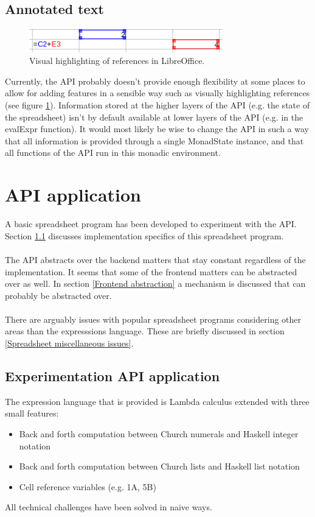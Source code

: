 \documentclass[10pt,a4paper]{article}
\begin{document}
\subsection{Annotated text}
\label{Annotated text}
\begin{figure}[H]
\centering
\includegraphics[width=0.75\textwidth]{referenceHighlighting.png}
\caption{Visual highlighting of references in LibreOffice.}
\label{Visual highlighting references}
\end{figure}
Currently, the API probably doesn't provide enough flexibility at some places to allow for adding
features in a sensible way such as visually highlighting references (see figure \ref{Visual highlighting references}).
Information stored at the higher layers of the API (e.g. the state of the spreadsheet) isn't
by default available at lower layers of the API (e.g. in the evalExpr function).
It would most likely be wise to change the API in such a way that all information is provided
through a single MonadState instance, and that all functions of the API run in this monadic
environment.

\section{API application}
\label{API application}
A basic spreadsheet program has been developed to experiment with the API.
Section \ref{Experimentation API application} discusses implementation specifics of this
spreadsheet program.
\\\\
The API abstracts over the backend matters that stay constant regardless of the implementation.
It seems that some of the frontend matters can be abstracted over as well. In section
\ref{Frontend abstraction} a mechanism is discussed that can probably be abstracted over.
\\\\
There are arguably issues with popular spreadsheet programs considering other areas than the
expresssions language. These are briefly discussed in section \ref{Spreadsheet miscellaneous issues}.

\subsection{Experimentation API application}
\label{Experimentation API application}
The expression language that is provided is Lambda calculus extended with three small features:
\begin{itemize}
\item Back and forth computation between Church numerals and Haskell integer notation
\item Back and forth computation between Church lists and Haskell list notation
\item Cell reference variables (e.g. 1A, 5B)
\end{itemize}
All technical challenges have been solved in naive ways.
\end{document}
